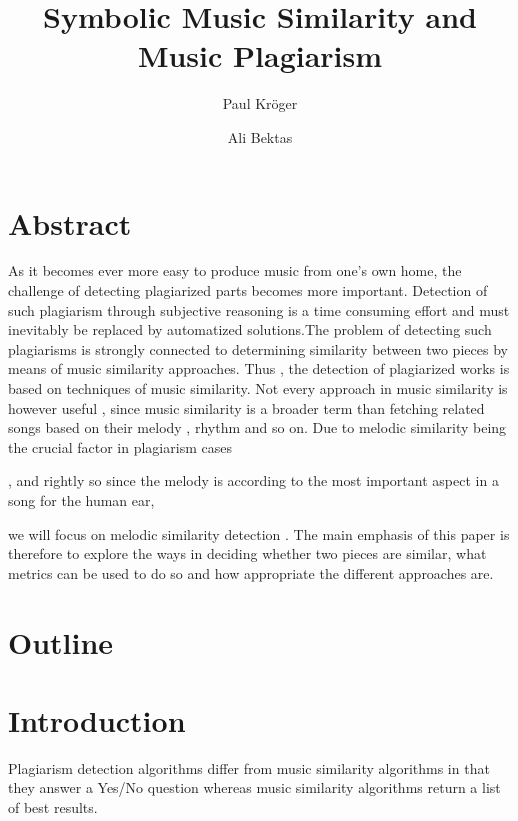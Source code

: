 \documentclass{article}
\author{Paul Kröger \and Ali Bektas}
\title{Symbolic Music Similarity and Music Plagiarism}
\begin{document}
	\maketitle

	\section*{Abstract} 

	As it becomes ever more easy to produce music from one's own home, the challenge of detecting plagiarized 
	parts becomes more important. Detection of such plagiarism through subjective reasoning is a time consuming 
	effort and must inevitably be replaced by automatized solutions.The problem of detecting such plagiarisms 
	is strongly connected to determining similarity between two pieces by means of music similarity approaches. 
	Thus , the detection of plagiarized works is based on techniques of music similarity. Not every 
	approach in music similarity is however useful , since music similarity is a broader term than fetching 
	related songs based on their melody , rhythm and so on. 
	Due to melodic similarity being the crucial factor in plagiarism cases \cite{one_point_one}
	

	, and rightly so since the 
	melody is according to \cite{lost} the most important aspect in a song for the human ear,

	 
	we will focus on melodic similarity detection . The main emphasis of this paper is therefore to 
	explore the ways in deciding whether two pieces are similar, what metrics can be used to do so and how 
	appropriate the different approaches are.  
	
	\section*{Outline}


	\section*{Introduction}
		Plagiarism detection algorithms differ from music similarity algorithms in that they answer a Yes/No question whereas music similarity algorithms return a list of best results.
\end{document}

